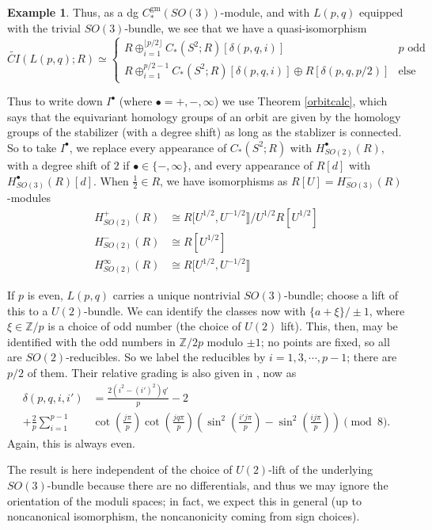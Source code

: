 \documentclass{memo-l}
\theoremstyle{definition}
\newtheorem{example}[theorem]{Example}
\theoremstyle{remark}
\numberwithin{section}{chapter}
\numberwithin{equation}{chapter}
\begin{document}
\begin{example}
Thus, as a dg $C^\text{gm}_*(SO(3))$-module, and with $L(p,q)$ equipped with the trivial $SO(3)$-bundle, we see that we have a quasi-isomorphism
$$\widetilde{CI}(L(p,q); R) \simeq \begin{cases}
R \oplus_{i=1}^{\lfloor p/2 \rfloor} C_*(S^2;R)[\delta(p,q,i)] & p \text{ odd} \\
R \oplus_{i=1}^{p/2 - 1} C_*(S^2;R)[\delta(p,q,i)] \oplus R[\delta(p,q,p/2)] & \text{else}
\end{cases}$$

Thus to write down $I^\bullet$ (where $\bullet = +, -, \infty$) we use Theorem \ref{orbitcalc}, which says that the equivariant homology groups of an orbit are given by the homology groups of the stabilizer (with a degree shift) as long as the stablizer is connected. So to take $I^\bullet$, we replace every appearance of $C_*(S^2;R)$ with $H^\bullet_{SO(2)}(R)$, with a degree shift of $2$ if $\bullet \in \{-,\infty\}$, and every appearance of $R[d]$ with $H^\bullet_{SO(3)}(R)[d]$. When $\frac 12 \in R$, we have isomorphisms as $R[U] = H^-_{SO(3)}(R)$-modules
\begin{align*}H_{SO(2)}^+(R) &\cong R[U^{1/2},U^{-1/2}\rrbracket\big/U^{1/2}R[U^{1/2}]\\
H_{SO(2)}^-(R) &\cong R[U^{1/2}] \\
H_{SO(2)}^\infty(R) &\cong R[U^{1/2},U^{-1/2}\rrbracket
\end{align*}

If $p$ is even, $L(p,q)$ carries a unique nontrivial $SO(3)$-bundle; choose a lift of this to a $U(2)$-bundle. We can identify the classes now with $\{a + \xi\}/\pm 1$, where $\xi \in \mathbb Z/p$ is a choice of odd number (the choice of $U(2)$ lift). This, then, may be identified with the odd numbers in $\mathbb Z/2p$ modulo $\pm 1$; no points are fixed, so all are $SO(2)$-reducibles. So we label the reducibles by $i = 1, 3, \cdots, p-1$; there are $p/2$ of them. Their relative grading is also given in \cite{LensSpaceModuli}, now as
\begin{align*}
\delta(p,q,i,i') &= \frac{2(i^2 - (i')^2)q'}{p} - 2  \\
+\frac 2p \sum_{i=1}^{p-1} &\cot\left(\frac{j \pi}{p}\right)\cot\left(\frac{jq \pi}{p}\right)\left(\sin^2\left(\frac{i'j\pi}{p}\right) -  \sin^2\left(\frac{ij\pi}{p}\right)\right) \pmod 8.
\end{align*}
Again, this is always even.

The result is here independent of the choice of $U(2)$-lift of the underlying $SO(3)$-bundle because there are no differentials, and thus we may ignore the orientation of the moduli spaces; in fact, we expect this in general (up to noncanonical isomorphism, the noncanonicity coming from sign choices).
\end{example}
\end{document}
